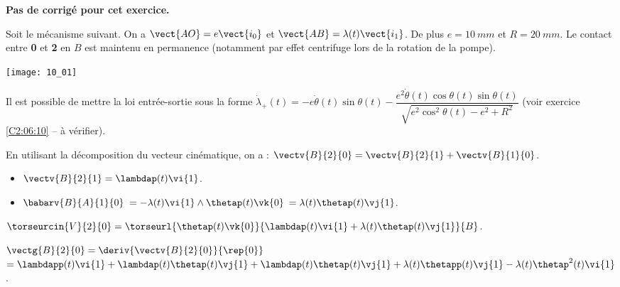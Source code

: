 \normaltrue \difficilefalse \tdifficilefalse
\correctiontrue

\setcounter{numques}{0}
\ifcorrection
\else
\textbf{Pas de corrigé pour cet exercice.}
\fi

\ifprof
\else
Soit le mécanisme suivant. On a $\vect{AO}=e\vect{i_0}$ et $\vect{AB}=\lambda(t)\vect{i_1}$. De plus $e=\SI{10}{mm}$ et $R=\SI{20}{mm}$. Le contact entre \textbf{0} et \textbf{2} en $B$ est maintenu en permanence (notamment par effet centrifuge lors de la rotation de la pompe).
\begin{center}
\texttt{[image: 10\_01]}
\end{center}

Il est possible de mettre la loi entrée-sortie sous la forme 
$ \dot{\lambda}_{+}(t)= -e\dot{\theta}(t)\sin\theta(t)-  \dfrac{ e^2\dot{\theta}(t)\cos\theta(t)\sin\theta(t)}{ \sqrt{e^2\cos^2\theta(t)-e^2+R^2}}$
(voir exercice \ref{C2:06:10} -- à vérifier).

\fi



\ifprof

En utilisant la décomposition du vecteur cinématique, on a :
$\vectv{B}{2}{0} = \vectv{B}{2}{1}+\vectv{B}{1}{0}$.

\begin{itemize}
\item $\vectv{B}{2}{1} = \lambdap(t) \vi{1}$.
\item $\babarv{B}{A}{1}{0}$ $=-\lambda(t)\vi{1}\wedge\thetap(t)\vk{0}$ $=\lambda(t)\thetap(t)\vj{1}$.
\end{itemize}

$\torseurcin{V}{2}{0} = \torseurl{\thetap(t)\vk{0}}{\lambdap(t) \vi{1}+\lambda(t)\thetap(t)\vj{1}}{B}$.

\else
\fi


\ifprof

$\vectg{B}{2}{0} = \deriv{\vectv{B}{2}{0}}{\rep{0}}$
$= \lambdapp(t) \vi{1}+\lambdap(t) \thetap(t) \vj{1}+\lambdap(t)\thetap(t)\vj{1}+\lambda(t)\thetapp(t)\vj{1}-\lambda(t)\thetap^2(t)\vi{1} $.


\else
\fi


